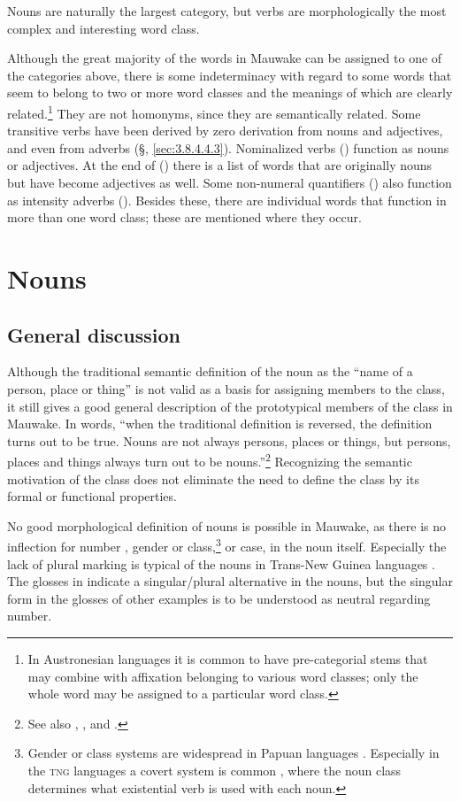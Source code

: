 Nouns are naturally the largest category, but verbs are morphologically the most complex and interesting word class.

Although the great majority of the words in Mauwake can be assigned to one of the categories above, there is some indeterminacy with regard to some words that seem to belong to two or more word classes and the meanings of which are clearly related.\footnote{In Austronesian languages it is common to have pre-categorial stems that may combine with affixation belonging to various word classes; only the whole word may be assigned to a particular word class.} They are not homonyms, since they are semantically related. Some transitive verbs have been derived by zero derivation from nouns and adjectives, and even from adverbs (§, \ref{sec:3.8.4.4.3}). Nominalized verbs () function as nouns or adjectives. At the end of () there is a list of words that are originally nouns but have become adjectives as well. Some non-numeral quantifiers () also function as intensity adverbs (). Besides these, there are individual words that function in more than one word class; these are mentioned where they occur.

\section{Nouns}\label{sec:3.2}
{}
\subsection{General discussion}\label{sec:3:2:1}
{}
Although the traditional semantic definition of the noun as the ``name of a person, place or thing'' is not valid as a basis for assigning members to the class, it still gives a good general description of the prototypical members of the class in Mauwake. In  words, ``when the traditional definition is reversed, the definition turns out to be true. Nouns are not always persons, places or things, but persons, places and things always turn out to be nouns.''\footnote{See also \citet[117]{Sapir1921}, \citet[60]{Jespersen1924}, \citet[449]{Lyons1977} and \citet[7]{Schachter1985}.} Recognizing the semantic motivation of the class does not eliminate the need to define the class by its formal or functional properties.

No good morphological definition of nouns is possible in Mauwake, as there is no inflection for number , gender or class,\footnote{Gender or class systems are widespread in Papuan languages \citep[77]{Foley1986}. Especially in the \textsc{tng} languages a covert system is common \citep[58]{Wurm1982}, where the noun class determines what existential verb is used with each noun.} or case, in the noun itself. Especially the lack of plural marking is typical of the nouns in Trans-New Guinea languages \citep[36]{Wurm1982}. The glosses in  indicate a singular/plural alternative in the nouns, but the singular form in the glosses of other examples is to be understood as neutral regarding number. 

